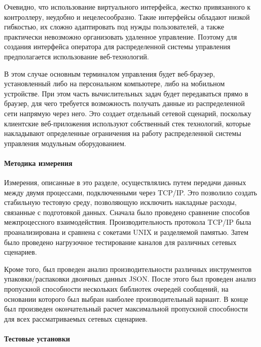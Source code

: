 \begin{enumerate}
Очевидно, что использование виртуального интерфейса, жестко привязанного к контроллеру, неудобно и нецелесообразно. Такие интерфейсы обладают низкой гибкостью, их сложно адаптировать под нужды пользователей, а также практически невозможно организовать удаленное управление. Поэтому для создания интерфейса оператора для распределенной системы управления предполагается использование веб-технологий.

В этом случае основным терминалом управления будет веб-браузер, установленный либо на персональном компьютере, либо на мобильном устройстве. При этом часть вычислительных задач будет передаваться прямо в браузер, для чего требуется возможность получать данные из распределенной сети напрямую через него. Это создает отдельный сетевой сценарий, поскольку клиентские веб-приложения используют собственный стек технологий, которые накладывают определенные ограничения на работу распределенной системы управления модульным оборудованием.

\end{enumerate}

\paragraph{Методика измерения}
\label{sec:methodology}

Измерения, описанные в это разделе, осуществлялись путем передачи данных между двумя процессами, подключенными через TCP/IP. Это позволило создать стабильную тестовую среду, позволяющую исключить накладные расходы, связанные с подготовкой данных. Сначала было проведено сравнение способов межпроцессного взаимодействия. Производительность протокола TCP/IP была проанализирована и сравнена с сокетами UNIX и разделяемой памятью. Затем было проведено нагрузочное тестирование каналов для различных сетевых сценариев.

Кроме того, был проведен анализ производительности различных инструментов упаковки/распаковки двоичных данных JSON. После этого был проведен анализ пропускной способности нескольких библиотек очередей сообщений, на основании которого был выбран наиболее производительный вариант. В конце был произведен окончательный расчет максимальной пропускной способности для всех рассматриваемых сетевых сценариев.

\paragraph{Тестовые установки}


